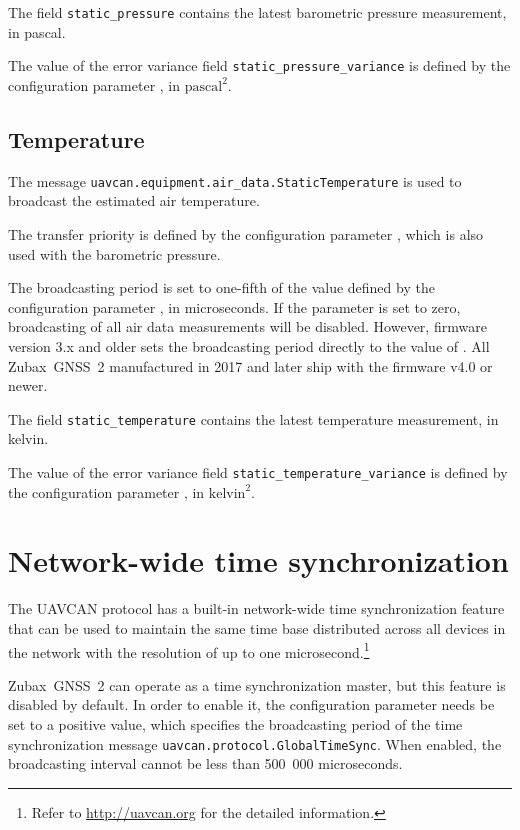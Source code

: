 \documentclass{zubaxdoc}
\begin{document}
The field \verb|static_pressure| contains the latest barometric pressure measurement, in pascal.

The value of the error variance field \verb|static_pressure_variance| is defined by the configuration
parameter , in $\text{pascal}^2$.

\subsection{Temperature}

The message \verb|uavcan.equipment.air_data.StaticTemperature| is used to broadcast the
estimated air temperature.

The transfer priority is defined by the configuration parameter ,
which is also used with the barometric pressure.

The broadcasting period is set to one-fifth of the value defined by the configuration
parameter , in microseconds.
If the parameter is set to zero, broadcasting of all air data measurements will be disabled.
However, firmware version 3.x and older sets the broadcasting period directly to the value
of .
All Zubax~GNSS~2 manufactured in 2017 and later ship with the firmware v4.0 or newer.

The field \verb|static_temperature| contains the latest temperature measurement, in kelvin.

The value of the error variance field \verb|static_temperature_variance| is defined by the configuration
parameter , in $\text{kelvin}^2$.

\section{Network-wide time synchronization}

The UAVCAN protocol has a built-in network-wide time synchronization feature
that can be used to maintain the same time base distributed across all devices in the network
with the resolution of up to one
microsecond.\footnote{Refer to \url{http://uavcan.org} for the detailed information.}

Zubax~GNSS~2 can operate as a time synchronization master, but this feature is disabled by default.
In order to enable it, the configuration parameter  needs be set to a
positive value, which specifies the broadcasting period of the time synchronization message
\verb|uavcan.protocol.GlobalTimeSync|.
When enabled, the broadcasting interval cannot be less than 500~000 microseconds.
\end{document}
